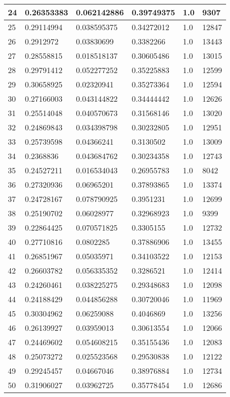 \begin{longtable}{|l|l|l|l|l|l|}
24 & 0.26353383 & 0.062142886 & 0.39749375 & 1.0 & 9307 \\ \hline 
25 & 0.29114994 & 0.038595375 & 0.34272012 & 1.0 & 12847 \\ \hline 
26 & 0.2912972 & 0.03830699 & 0.3382266 & 1.0 & 13443 \\ \hline 
27 & 0.28558815 & 0.018518137 & 0.30605486 & 1.0 & 13015 \\ \hline 
28 & 0.29791412 & 0.052277252 & 0.35225883 & 1.0 & 12599 \\ \hline 
29 & 0.30658925 & 0.02320941 & 0.35273364 & 1.0 & 12594 \\ \hline 
30 & 0.27166003 & 0.043144822 & 0.34444442 & 1.0 & 12626 \\ \hline 
31 & 0.25514048 & 0.040570673 & 0.31568146 & 1.0 & 13020 \\ \hline 
32 & 0.24869843 & 0.034398798 & 0.30232805 & 1.0 & 12951 \\ \hline 
33 & 0.25739598 & 0.04366241 & 0.3130502 & 1.0 & 13009 \\ \hline 
34 & 0.2368836 & 0.043684762 & 0.30234358 & 1.0 & 12743 \\ \hline 
35 & 0.24527211 & 0.016534043 & 0.26955783 & 1.0 & 8042 \\ \hline 
36 & 0.27320936 & 0.06965201 & 0.37893865 & 1.0 & 13374 \\ \hline 
37 & 0.24728167 & 0.078790925 & 0.3951231 & 1.0 & 12699 \\ \hline 
38 & 0.25190702 & 0.06028977 & 0.32968923 & 1.0 & 9399 \\ \hline 
39 & 0.22864425 & 0.070571825 & 0.3305155 & 1.0 & 12732 \\ \hline 
40 & 0.27710816 & 0.0802285 & 0.37886906 & 1.0 & 13455 \\ \hline 
41 & 0.26851967 & 0.05035971 & 0.34103522 & 1.0 & 12153 \\ \hline 
42 & 0.26603782 & 0.056335352 & 0.3286521 & 1.0 & 12414 \\ \hline 
43 & 0.24260461 & 0.038225275 & 0.29348683 & 1.0 & 12098 \\ \hline 
44 & 0.24188429 & 0.044856288 & 0.30720046 & 1.0 & 11969 \\ \hline 
45 & 0.30304962 & 0.06259088 & 0.4046869 & 1.0 & 13256 \\ \hline 
46 & 0.26139927 & 0.03959013 & 0.30613554 & 1.0 & 12066 \\ \hline 
47 & 0.24469602 & 0.054608215 & 0.35155436 & 1.0 & 12083 \\ \hline 
48 & 0.25073272 & 0.025523568 & 0.29530838 & 1.0 & 12122 \\ \hline 
49 & 0.29245457 & 0.04667046 & 0.38976884 & 1.0 & 12734 \\ \hline 
50 & 0.31906027 & 0.03962725 & 0.35778454 & 1.0 & 12686 \\ \hline 
\end{longtable}